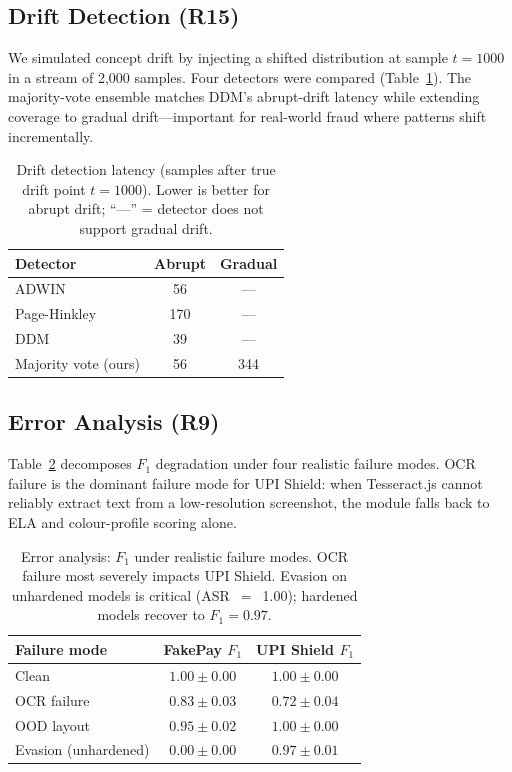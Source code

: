 \documentclass[conference]{IEEEtran}
\begin{document}
\subsection{Drift Detection (R15)}\label{sec:drift}
We simulated concept drift by injecting a shifted distribution at
sample $t{=}1000$ in a stream of 2{,}000 samples.
Four detectors were compared (Table~\ref{tab:drift}).
The majority-vote ensemble matches DDM's abrupt-drift latency while
extending coverage to gradual drift---important for real-world fraud
where patterns shift incrementally.

\begin{table}[t]
\caption{Drift detection latency (samples after true drift point
$t{=}1000$). Lower is better for abrupt drift; ``---'' = detector does
not support gradual drift.}
\label{tab:drift}
\centering
\small
\begin{tabular}{lcc}
\toprule
\textbf{Detector} & \textbf{Abrupt} & \textbf{Gradual} \\
\midrule
ADWIN                  & 56  & --- \\
Page-Hinkley           & 170 & --- \\
DDM                    & 39  & --- \\
Majority vote (ours)   & 56  & 344 \\
\bottomrule
\end{tabular}
\end{table}

\subsection{Error Analysis (R9)}\label{sec:error}
Table~\ref{tab:error} decomposes $F_1$ degradation under four realistic
failure modes.
OCR failure is the dominant failure mode for UPI Shield: when
Tesseract.js cannot reliably extract text from a low-resolution
screenshot, the module falls back to ELA and colour-profile scoring
alone.

\begin{table}[t]
\caption{Error analysis: $F_1$ under realistic failure modes. OCR
failure most severely impacts UPI Shield. Evasion on unhardened models
is critical (ASR~$=$~1.00); hardened models recover to $F_1{=}0.97$.}
\label{tab:error}
\centering
\small
\begin{tabular}{lcc}
\toprule
\textbf{Failure mode} & \textbf{FakePay $F_1$}
  & \textbf{UPI Shield $F_1$} \\
\midrule
Clean                & $1.00{\pm}0.00$ & $1.00{\pm}0.00$ \\
OCR failure          & $0.83{\pm}0.03$ & $0.72{\pm}0.04$ \\
OOD layout           & $0.95{\pm}0.02$ & $1.00{\pm}0.00$ \\
Evasion (unhardened) & $0.00{\pm}0.00$ & $0.97{\pm}0.01$ \\
\bottomrule
\end{tabular}
\end{table}
\end{document}
